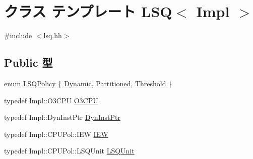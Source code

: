 \hypertarget{classLSQ}{
\section{クラス テンプレート LSQ$<$ Impl $>$}
\label{classLSQ}
}


{\ttfamily \#include $<$lsq.hh$>$}\subsection*{Public 型}
\begin{DoxyCompactItemize}
\item 
enum \hyperlink{classLSQ_a2ecb54b28634ef872a820651cce92599}{LSQPolicy} \{ \hyperlink{classLSQ_a2ecb54b28634ef872a820651cce92599a96535b1625776102bcc13f7dfb598dcb}{Dynamic}, 
\hyperlink{classLSQ_a2ecb54b28634ef872a820651cce92599add8dfa69b567f90d3f13d819109ab74e}{Partitioned}, 
\hyperlink{classLSQ_a2ecb54b28634ef872a820651cce92599a267544c4de8ecc66bd0fed6310af63be}{Threshold}
 \}
\item 
typedef Impl::O3CPU \hyperlink{classLSQ_a44622cf06940413482836cb62931ac3f}{O3CPU}
\item 
typedef Impl::DynInstPtr \hyperlink{classLSQ_a028ce10889c5f6450239d9e9a7347976}{DynInstPtr}
\item 
typedef Impl::CPUPol::IEW \hyperlink{classLSQ_a23f60a4095b5240dfcb18a4ec40210a9}{IEW}
\item 
typedef Impl::CPUPol::LSQUnit \hyperlink{classLSQ_a978eac36269e7f814c4b396c9e4bf51e}{LSQUnit}
\end{DoxyCompactItemize}
